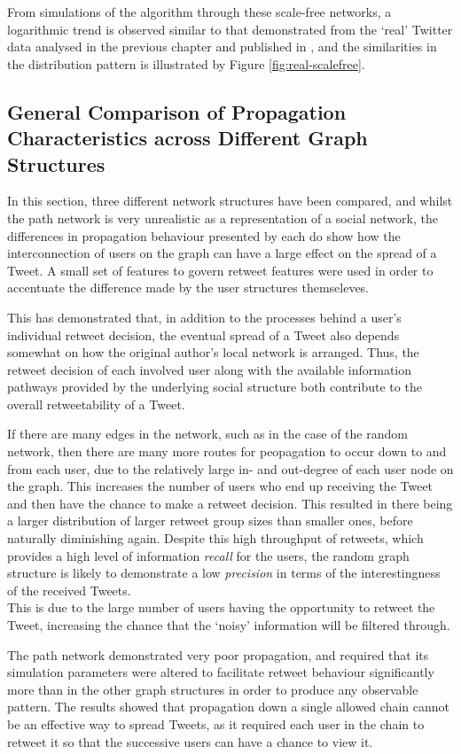 From simulations of the algorithm through these scale-free networks, a logarithmic trend is observed similar to that demonstrated from the `real' Twitter data analysed in the previous chapter and published in \cite{webberley11}, and the similarities in the distribution pattern is illustrated by Figure \ref{fig:real-scalefree}.


\subsection{General Comparison of Propagation Characteristics across Different Graph Structures}
In this section, three different network structures have been compared, and whilst the path network is very unrealistic as a representation of a social network, the differences in propagation behaviour presented by each do show how the interconnection of users on the graph can have a large effect on the spread of a Tweet. A small set of features to govern retweet features were used in order to accentuate the difference made by the user structures themseleves.

This has demonstrated that, in addition to the processes behind a user's individual retweet decision, the eventual spread of a Tweet also depends somewhat on how the original author's local network is arranged. Thus, the retweet decision of each involved user along with the available information pathways provided by the underlying social structure both contribute to the overall retweetability of a Tweet. 

If there are many edges in the network, such as in the case of the random network, then there are many more routes for peopagation to occur down to and from each user, due to the relatively large in- and out-degree of each user node on the graph. This increases the number of users who end up receiving the Tweet and then have the chance to make a retweet decision. This resulted in there being a larger distribution of larger retweet group sizes than smaller ones, before naturally diminishing again. Despite this high throughput of retweets, which provides a high level of information \textit{recall} for the users, the random graph structure is likely to demonstrate a low \textit{precision} in terms of the interestingness of the received Tweets.\\
This is due to the large number of users having the opportunity to retweet the Tweet, increasing the chance that the `noisy' information will be filtered through.

The path network demonstrated very poor propagation, and required that its simulation parameters were altered to facilitate retweet behaviour significantly more than in the other graph structures in order to produce any observable pattern. The results showed that propagation down a single allowed chain cannot be an effective way to spread Tweets, as it required each user in the chain to retweet it so that the successive users can have a chance to view it.

